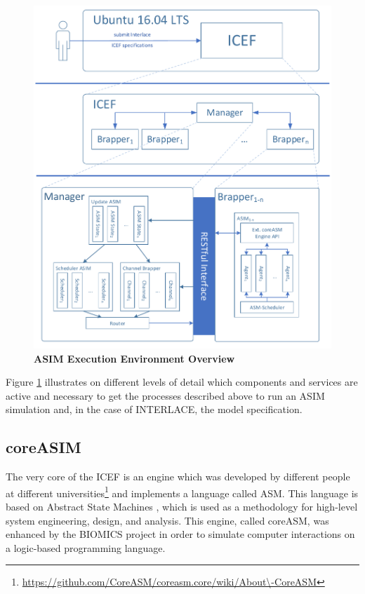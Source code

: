\begin{figure}[htbp]
  \centering
  \includegraphics[width=1.0\textwidth, clip, trim=1mm 1mm 1mm 1mm]{Figures/environment_asim}
  \caption{\bf\small ASIM Execution Environment Overview}
  \label{fig:icef-intro-asim}
\end{figure}

Figure \ref{fig:icef-intro-asim} illustrates on different levels of detail which components and services are active and necessary to get the processes described above to run an ASIM simulation and, in the case of INTERLACE, the model specification.

\subsection{coreASIM}
\label{sec:coreasim-details}

The very core of the ICEF is an engine which was developed by different people at different universities\footnote{\url{https://github.com/CoreASM/coreasm.core/wiki/About\-CoreASM}} and implements a language called ASM. This language is based on Abstract State Machines \cite{BoergerStaerk2003,BoergerRaschke2018}, which is used as a methodology for high-level system engineering, design, and analysis. This engine, called coreASM, was enhanced by the BIOMICS project in order to simulate computer interactions on a logic-based programming language.

